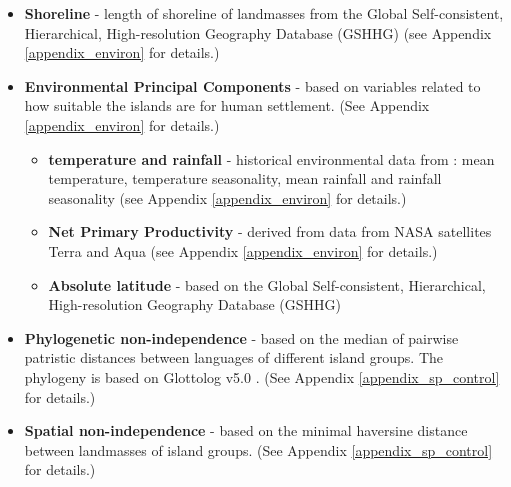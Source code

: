 \documentclass[unnumsec,webpdf,modern,medium]{oup-authoring-template}
\providecommand{\DIFaddtex}[1]{{\protect\color{blue} \sf #1}} %
\providecommand{\DIFaddbegin}{} %
\providecommand{\DIFadd}[1]{\texorpdfstring{\DIFaddtex{#1}}{#1}} %
\newcommand{\DIFaddincludegraphics}[2][]{{\color{blue}\fbox{\DIFOincludegraphics[#1]{#2}}}} %
\DeclareRobustCommand{\DIFaddbegin}{\DIFOaddbegin \let\includegraphics\DIFaddincludegraphics} %
\begin{document}
\begin{itemize}
\begin{itemize}
\DIFaddbegin \item \DIFadd{\textbf{Shoreline} - length of shoreline of landmasses from the Global Self-consistent, Hierarchical, High-resolution Geography Database (GSHHG) \citep{wessel1996global} (see Appendix \ref{appendix_environ} for details.)
}

\item \DIFadd{\textbf{Environmental Principal Components} - based on variables related to how suitable the islands are for human settlement. (See Appendix \ref{appendix_environ} for details.)
}


\begin{itemize}
    \item \DIFadd{\textbf{temperature and rainfall} - historical environmental data from \citet{ecoclimate}: mean temperature, temperature seasonality, mean rainfall and rainfall seasonality (see Appendix \ref{appendix_environ} for details.)
    }\item \DIFadd{\textbf{Net Primary Productivity} - derived from data from NASA satellites Terra and Aqua \citep{running2021modis_aqua, running2021modis_terra} (see Appendix \ref{appendix_environ} for details.)
    }\item \DIFadd{\textbf{Absolute latitude} - based on the Global Self-consistent, Hierarchical, High-resolution Geography Database (GSHHG) 
}\end{itemize}

 \item \DIFadd{\textbf{Phylogenetic non-independence} - based on the median of pairwise patristic distances between languages of different island groups. The phylogeny is based on Glottolog v5.0 \citep{Glottolog5}. (See Appendix \ref{appendix_sp_control} for details.)
 }

\item \DIFadd{\textbf{Spatial non-independence} - based on the minimal haversine distance between landmasses of island groups. (See Appendix \ref{appendix_sp_control} for details.)
}

\end{itemize}
\end{itemize}
\end{document}

